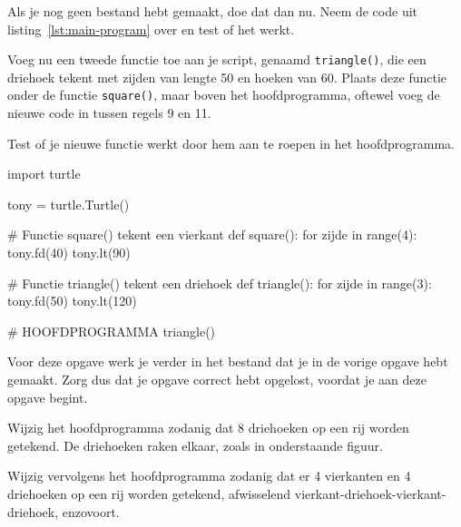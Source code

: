 \documentclass[../main]{subfiles}
\begin{document}
\begin{opgave}[icons={laptop}]
Als je nog geen bestand  hebt gemaakt, doe dat dan nu. Neem de code uit listing~\ref{lst:main-program} over en test of het werkt.

Voeg nu een tweede functie toe aan je script, genaamd \texttt{triangle()}, die een driehoek tekent met zijden van lengte 50 en hoeken van 60\textdegree. Plaats deze functie onder de functie \texttt{square()}, maar boven het hoofdprogramma, oftewel voeg de nieuwe code in tussen regels 9 en 11.

Test of je nieuwe functie werkt door hem aan te roepen in het hoofdprogramma. 
\end{opgave}
\begin{antwoord}
\begin{python-breakable}[style=mu-noframe]
import turtle

tony = turtle.Turtle()

# Functie square() tekent een vierkant
def square():
    for zijde in range(4):
        tony.fd(40)
        tony.lt(90)

# Functie triangle() tekent een driehoek
def triangle():
    for zijde in range(3):
        tony.fd(50)
        tony.lt(120)

# HOOFDPROGRAMMA
triangle()
\end{python-breakable} 
\end{antwoord}
\begin{opgave}[icons={laptop}]
Voor deze opgave werk je verder in het bestand  dat je in de vorige opgave hebt gemaakt. Zorg dus dat je opgave \pgfmathresult{} correct hebt opgelost, voordat je aan deze opgave begint.
\begin{qlist}
\item Wijzig het hoofdprogramma zodanig dat 8 driehoeken op een rij worden getekend. De driehoeken raken elkaar, zoals in onderstaande figuur.
\begin{center}
\end{center}
\item Wijzig vervolgens het hoofdprogramma zodanig dat er 4 vierkanten en 4 driehoeken op een rij worden getekend, afwisselend vierkant-driehoek-vierkant-driehoek, enzovoort.
\begin{center}
\end{center}
\end{qlist}
\end{opgave}
\end{document}

